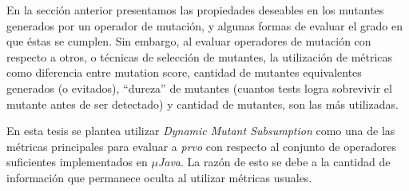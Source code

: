 En la secci\'on anterior presentamos las propiedades deseables en los mutantes generados por un operador de mutaci\'on, y algunas formas de evaluar el grado en que \'estas se cumplen. Sin embargo, al evaluar operadores de mutaci\'on con respecto a otros, o t\'ecnicas de selecci\'on de mutantes, la utilizaci\'on de m\'etricas como diferencia entre mutation score, cantidad de mutantes equivalentes generados (o evitados), ``dureza'' de mutantes (cuantos tests logra sobrevivir el mutante antes de ser detectado) y cantidad de mutantes, son las m\'as utilizadas.

En esta tesis se plantea utilizar \emph{Dynamic Mutant Subsumption} como una de las m\'etricas principales para evaluar a \emph{prvo} con respecto al conjunto de operadores suficientes implementados en \emph{$\mu$Java}. La raz\'on de esto se debe a la cantidad de informaci\'on que permanece oculta al utilizar m\'etricas usuales.

